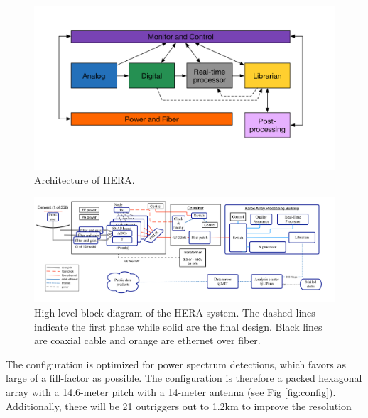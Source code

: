 \documentclass{article}
\begin{document}
\begin{figure}[t]
\centerline{
\includegraphics[width=\textwidth]{plots/sysOver.png} }
\caption{\small Architecture of HERA.
\label{fig:architecture}}
\end{figure}

\begin{figure}[t]
\centerline{
\includegraphics[width=\textwidth]{plots/HERA_high_level_block_diagram.png} }
\caption{\small High-level block diagram of the HERA system.  The dashed lines indicate the first phase while solid are the final design.  Black lines are coaxial cable and orange are ethernet over fiber.
\label{fig:system}}
\end{figure}

The configuration is optimized for power spectrum detections, which favors as large of a fill-factor as possible.  The configuration is therefore a packed hexagonal array with a 14.6-meter pitch with a 14-meter antenna (see Fig \ref{fig:config}).  Additionally, there will be 21 outriggers out to 1.2km to improve the resolution 
\end{document}
